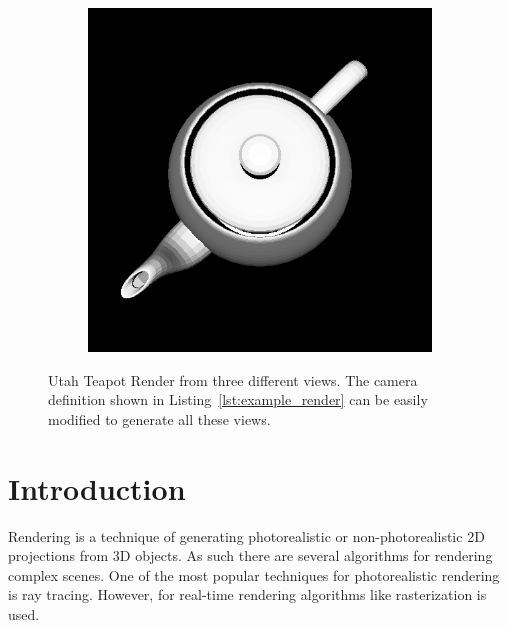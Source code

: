 \documentclass{juliacon}
\begin{document}
\begin{figure}[!htb]
\begin{subfigure}[b]{0.3\textwidth}
        \caption*{}
    \end{subfigure}
    \hfill
    \begin{subfigure}[b]{0.3\textwidth}
        \centering
        \includegraphics[width=\textwidth]{images/render/teapot_top.jpg}
        \caption*{}
    \end{subfigure}
    \caption{Utah Teapot Render from three different views. The camera definition shown in Listing~\protect\ref{lst:example_render} can be easily modified to generate all these views.}
    \label{fig:teapot_render}
\end{figure}

\section{Introduction}
\label{intro}

Rendering is a technique of generating photorealistic or non-photorealistic 2D projections from 3D objects. As such there are several algorithms for rendering complex scenes. One of the most popular techniques for photorealistic rendering is ray tracing. However, for real-time rendering algorithms like rasterization is used.
\end{document}
